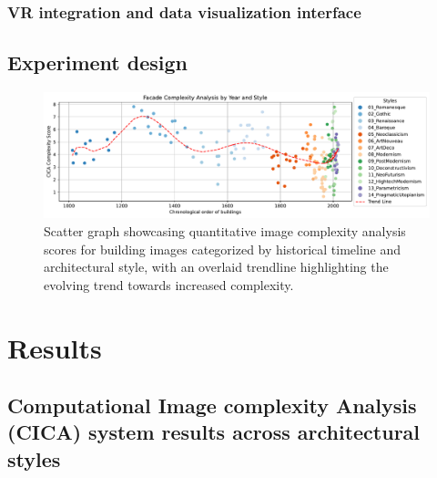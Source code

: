 \documentclass[final,5p,times]{elsarticle}%
\begin{document}
\begin{linenumbers}
        \subsubsection{VR integration and data visualization interface}
        \label{subsubsec:VR_integration}
        

    \subsection{Experiment design}
    \label{subsec:Experiment_design}
    

            \begin{figure}[htb]
          \centering
          \includegraphics[width= \linewidth]{Graphs/complexitygraph}
          \caption{Scatter graph showcasing quantitative image complexity analysis scores for building images categorized by historical timeline and architectural style, with an overlaid trendline highlighting the evolving trend towards increased complexity.}
          \label{fig:HistoricalComplexityGraph}
     \end{figure}

\section{Results}
\label{sec:Results}



    \subsection{Computational Image complexity Analysis (CICA) system results across architectural styles}
    \label{subsec:ResultsComplexityImageAnalysishistory}
    


\end{linenumbers}
\end{document}
